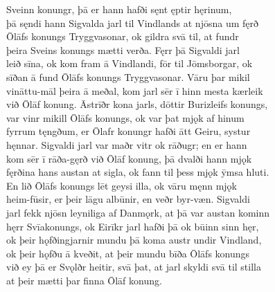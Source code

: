 \documentclass[12pt,letterpaper]{book}
\begin{document}
\begin{linenumbers}
Sveinn konungr, þā er hann hafði sęnt ęptir hęrinum,\\
þā sęndi hann Sigvalda jarl til Vindlands at njōsna um fęrð\\
Ōlāfs konungs Tryggvasonar, ok gildra svā til, at fundr\\
þeira Sveins konungs mætti verða.  Fęrr þā Sigvaldi jarl\\
leið sīna, ok kom fram ā Vindlandi, fōr til Jōmsborgar, ok\\
sīðan ā fund Ōlāfs konungs Tryggvasonar.  Vāru þar mikil\\
vināttu-māl þeira ā meðal, kom jarl sēr ī hinn mesta kærleik\\
við Ōlāf konung.  Āstrīðr kona jarls, dōttir Burizleifs konungs,\\
var vinr mikill Ōlāfs konungs, ok var þat mjǫk af hinum\\
fyrrum tęngðum, er Ōlafr konungr hafði ātt Geiru, systur\\
hęnnar.  Sigvaldi jarl var maðr vitr ok rāðugr; en er hann\\
kom sēr ī rāða-gęrð við Ōlāf konung, þā dvalði hann mjǫk\\
fęrðina hans austan at sigla, ok fann til þess mjǫk ȳmsa hluti.\\
En lið Ōlāfs konungs lēt geysi illa, ok vāru męnn mjǫk\\
heim-fūsir, er þeir lāgu albūnir, en veðr byr-væn.  Sigvaldi\\
jarl fekk njōsn leyniliga af Danmǫrk, at þā var austan kominn\\
hęrr Svīakonungs, ok Eirīkr jarl hafði þā ok būinn sinn hęr,\\
ok þeir hǫfðingjarnir mundu þā koma austr undir Vindland,\\
ok þeir hǫfðu ā kveðit, at þeir mundu bīða Ōlāfs konungs\\
við ey þā er Svǫlðr heitir, svā þat, at jarl skyldi svā til stilla\\
at þeir mætti þar finna Ōlāf konung.


\end{linenumbers}
\end{document}
